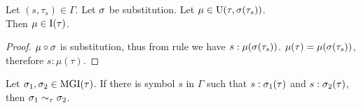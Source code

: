 \documentclass[a4paper,oneside]{memoir}
\begin{document}
\begin{lemma}
\label{lem:muInIt}
Let $(s,\tau_s) \in \Gamma$. Let $\sigma$ be substitution. Let $\mu \in \operatorname{U}(\tau,\sigma(\tau_s))$.\\ 
Then $\mu \in \operatorname{I}(\tau)$.  
\end{lemma}
\begin{proof}
$\mu \circ \sigma$ is substitution, 
thus from \subAx rule we have $s : \mu(\sigma(\tau_s))$.
$\mu(\tau) = \mu(\sigma(\tau_s))$, therefore $s : \mu(\tau)$. 

\end{proof}


\begin{lemma}
Let $\sigma_1, \sigma_2 \in \operatorname{MGI}(\tau)$.
If there is symbol $s$ in $\Gamma$ such that
$s : \sigma_1(\tau) $ and $ s : \sigma_2(\tau)$, then
$\sigma_1 \sim_\tau \sigma_2$.  
\end{lemma}
\end{document}
